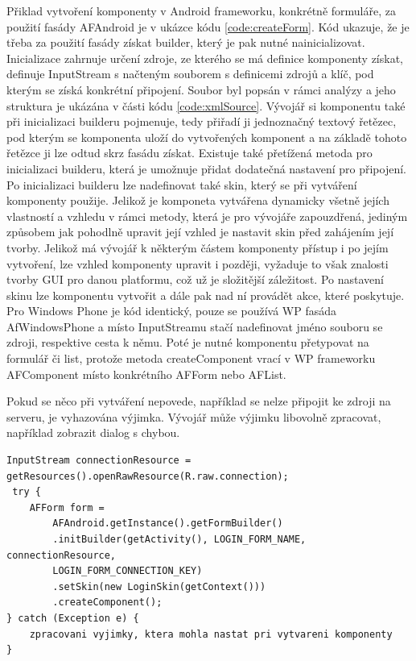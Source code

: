 Přiklad vytvoření komponenty v Android frameworku, konkrétně formuláře, za použití fasády AFAndroid je v ukázce kódu \ref{code:createForm}. Kód ukazuje, že je třeba za použití fasády získat builder, který je pak nutné nainicializovat. Inicializace zahrnuje určení zdroje, ze kterého se má definice komponenty získat, definuje InputStream s načteným souborem s definicemi zdrojů a klíč, pod kterým se získá konkrétní připojení. Soubor byl popsán v rámci analýzy a jeho struktura je ukázána v části kódu \ref{code:xmlSource}. Vývojář si komponentu také při inicializaci builderu pojmenuje, tedy přiřadí ji jednoznačný textový řetězec, pod kterým se komponenta uloží do vytvořených komponent a na základě tohoto řetězce ji lze odtud skrz fasádu získat. Existuje také přetížená metoda pro inicializaci builderu, která je umožnuje přidat dodatečná nastavení pro připojení. Po inicializaci builderu lze nadefinovat také skin, který se při vytváření komponenty použije. Jelikož je komponeta vytvářena dynamicky všetně jejích vlastností a vzhledu v rámci metody, která je pro vývojáře zapouzdřená, jediným způsobem jak pohodlně upravit její vzhled je nastavit skin před zahájením její tvorby. Jelikož má vývojář k některým částem komponenty přístup i po jejím vytvoření, lze vzhled komponenty upravit i později, vyžaduje to však znalosti tvorby GUI pro danou platformu, což už je složitější záležitost. Po nastavení skinu lze komponentu vytvořit a dále pak nad ní provádět akce, které poskytuje.  Pro Windows Phone je kód identický, pouze se používá WP fasáda AfWindowsPhone a místo InputStreamu stačí nadefinovat jméno souboru se zdroji, respektive cesta k němu. Poté je nutné komponentu přetypovat na formulář či list, protože metoda createComponent vrací v WP frameworku AFComponent místo konkrétního AFForm nebo AFList.

Pokud se něco při vytváření nepovede,  například se nelze připojit ke zdroji na serveru, je vyhazována výjimka. Vývojář může výjimku libovolně zpracovat, například zobrazit dialog s chybou.

\begin{lstlisting}[caption=Ukázka tvorby formuláře,
label={code:createForm}, basicstyle=\footnotesize]
InputStream connectionResource = getResources().openRawResource(R.raw.connection);
 try {
	AFForm form = 
		AFAndroid.getInstance().getFormBuilder()
		.initBuilder(getActivity(), LOGIN_FORM_NAME, connectionResource, 
		LOGIN_FORM_CONNECTION_KEY)
		.setSkin(new LoginSkin(getContext()))
		.createComponent();
} catch (Exception e) {
	zpracovani vyjimky, ktera mohla nastat pri vytvareni komponenty
}
\end{lstlisting} 

